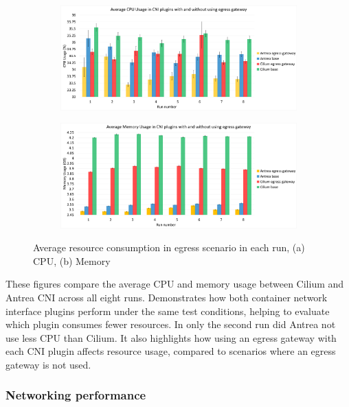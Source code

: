 \begin{figure}[H]
    \centering
    \begin{subfigure}[b]{1\textwidth}
        \includegraphics[width=\textwidth]{plots/egress/cpu_all.png}
        \caption{}
        \label{fig:cpu_all}
    \end{subfigure}
    \begin{subfigure}[b]{1\textwidth}
        \includegraphics[width=\textwidth]{plots/egress/memory_all.png}
        \caption{}
        \label{fig:memory_all}
    \end{subfigure}
    
    \caption{Average resource consumption in egress scenario in each run, (a) CPU, (b) Memory}
    \label{fig:res_all}
\end{figure}


These figures compare the average CPU and memory usage between Cilium and Antrea CNI across all eight runs. Demonstrates how both container network interface plugins perform under the same test conditions, helping to evaluate which plugin consumes fewer resources. In only the second run did Antrea not use less CPU than Cilium. It also highlights how using an egress gateway with each CNI plugin affects resource usage, compared to scenarios where an egress gateway is not used.



\subsubsection{Networking performance}
\label{sec:egressNetworkingPerformance}

